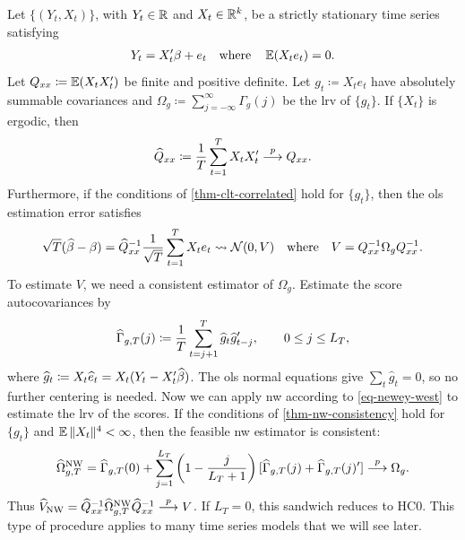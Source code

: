 \documentclass[a4paper,12pt]{article}
\begin{document}
\begin{example}\label{ex-linear-regression}
	Let $\{(Y_t,X_t)\}$, with $Y_t\in\mathbb{R}$ and $X_t\in\mathbb{R}^k$, be a strictly stationary time series satisfying
	\begin{align*}
		Y_t=X_t^{\prime}\beta+e_t
		\quad\text{where}\quad
		\operatorname{\mathbb{E}}(X_te_t)=0.
	\end{align*}
	Let $Q_{xx}\coloneqq \operatorname{\mathbb{E}}(X_tX_t^{\prime})$ be finite and positive definite.
	Let $g_t\coloneqq X_te_t$ have absolutely summable covariances and $\Omega_g\coloneqq \sum_{j=-\infty}^{\infty}\Gamma_g(j)$ be the \gls{lrv} of $\{g_t\}$.
	If $\{X_t\}$ is ergodic, then
	\begin{align}
		\widehat Q_{xx}\coloneqq\frac1T\sum_{t=1}^T X_tX_t^{\prime}\overset{p}{\longrightarrow} Q_{xx}.
	\end{align}
	Furthermore, if the conditions of \autoref{thm-clt-correlated} hold for $\{g_t\}$,
	then the \gls{ols} estimation error satisfies
	\begin{align*}
		\sqrt T(\widehat\beta-\beta)
		=\widehat Q_{xx}^{-1}\frac1{\sqrt T}\sum_{t=1}^T X_te_t
		\overset{}{\leadsto}\operatorname{\mathcal{N}}(0,V)
		\quad\text{where}\quad
		V=Q_{xx}^{-1}\Omega_gQ_{xx}^{-1}.
	\end{align*}
	To estimate $V$, we need a consistent estimator of $\Omega_g$.
	Estimate the score autocovariances by
	\begin{align*}
		\widehat\Gamma_{g,T}(j)
		\coloneqq\frac1T\sum_{t=j+1}^T\widehat g_t\widehat g_{t-j}^{\prime},
		\qquad 0\le j\le L_T,
	\end{align*}
	where $\widehat g_t\coloneqq X_t\widehat e_t=X_t(Y_t-X_t^{\prime}\widehat\beta)$.
	The \gls{ols} normal equations give $\sum_t\widehat g_t=0$, so no further centering is needed.
	Now we can apply \gls{nw} according to \eqref{eq-newey-west} to estimate the \gls{lrv} of the scores.
	If the conditions of \autoref{thm-nw-consistency} hold for $\{g_t\}$ and $\operatorname{\mathbb{E}}\|X_t\|^4<\infty$,
	then the feasible \gls{nw} estimator is consistent:
	\begin{align*}
		\widehat\Omega_{g,T}^{\mathrm{NW}}
		=\widehat\Gamma_{g,T}(0)+\sum_{j=1}^{L_T}\left(1-\frac{j}{L_T+1}\right)
		[\widehat\Gamma_{g,T}(j)+\widehat\Gamma_{g,T}(j)^{\prime}]
		\overset{p}{\longrightarrow}
		\Omega_g.
	\end{align*}
	Thus $\widehat V_{\mathrm{NW}}=\widehat Q_{xx}^{-1}\widehat\Omega_{g,T}^{\mathrm{NW}}\widehat Q_{xx}^{-1}\overset{p}{\longrightarrow} V$.
	If $L_T=0$, this sandwich reduces to HC0.
	This type of procedure applies to many time series models that we will see later.
\end{example}
\end{document}
